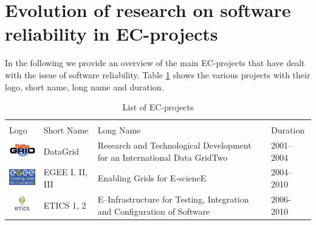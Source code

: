 \documentclass[journal]{IEEEtran}
\begin{document}
\section{Evolution of research on software reliability in EC-projects}
\label{sec:ev}

In the following we provide an overview of the main EC-projects that have dealt with the issue of software reliability. Table \ref{tab:eup} shows the various projects with their logo, short name, long name and duration.

\begin{table}[!h]
\renewcommand{\arraystretch}{1.3}
\caption{List of EC-projects}
\label{tab:eup}
\centering
\begin{tabular}{p{1.6cm}p{1.5cm}p{3cm}l}
\hline
\hline
\\
Logo & Short Name & Long Name & Duration\\
\hline
\hline
\begin{minipage}{.3\textwidth}
\includegraphics[width=15mm,height=7.5mm]{images/datagrid}
\end{minipage}
    & DataGrid &
Research and Technological Development for an International Data GridTwo & 2001--2004\\
\begin{minipage}{.3\textwidth}
\includegraphics[width=15mm,height=7.5mm]{images/egee}
\end{minipage}
     & EGEE I, II, III &
Enabling Grids for E-sciencE & 2004--2010\\
\begin{minipage}{.3\textwidth}
\includegraphics[width=15mm,height=7.5mm]{images/etics}
\end{minipage}
     & ETICS 1, 2 &
E--Infrastructure for Testing, Integration and Configuration of Software & 2006-2010\\

\end{tabular}
\end{table}
\end{document}
